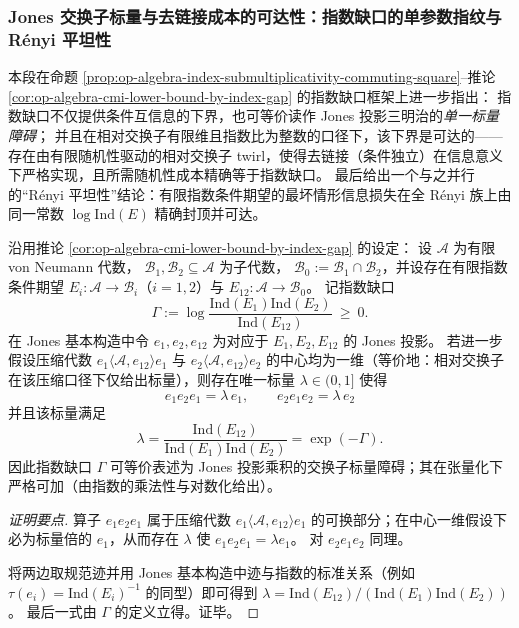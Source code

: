 \subsubsection{Jones 交换子标量与去链接成本的可达性：指数缺口的单参数指纹与 Rényi 平坦性}\label{subsubsec:op-algebra-jones-scalar-twirl-cost-renyi-flatness}
本段在命题 \ref{prop:op-algebra-index-submultiplicativity-commuting-square}--推论 \ref{cor:op-algebra-cmi-lower-bound-by-index-gap} 的指数缺口框架上进一步指出：
指数缺口不仅提供条件互信息的下界，也可等价读作 Jones 投影三明治的\emph{单一标量障碍}；
并且在相对交换子有限维且指数比为整数的口径下，该下界是可达的——存在由有限随机性驱动的相对交换子 twirl，使得去链接（条件独立）在信息意义下严格实现，且所需随机性成本精确等于指数缺口。
最后给出一个与之并行的“Rényi 平坦性”结论：有限指数条件期望的最坏情形信息损失在全 Rényi 族上由同一常数 \(\log\mathrm{Ind}(E)\) 精确封顶并可达。

\begin{proposition}\label{prop:op-algebra-jones-scalar-equals-exp-minus-gap}
沿用推论 \ref{cor:op-algebra-cmi-lower-bound-by-index-gap} 的设定：
设 \(\mathcal{A}\) 为有限 von Neumann 代数，
\(\mathcal{B}_1,\mathcal{B}_2\subseteq\mathcal{A}\) 为子代数，
\(\mathcal{B}_0:=\mathcal{B}_1\cap\mathcal{B}_2\)，并设存在有限指数条件期望
\(
E_i:\mathcal{A}\to\mathcal{B}_i
\)（\(i=1,2\)）与
\(
E_{12}:\mathcal{A}\to\mathcal{B}_0
\)。
记指数缺口
\[
\Gamma:=\log\frac{\mathrm{Ind}(E_1)\mathrm{Ind}(E_2)}{\mathrm{Ind}(E_{12})}\ \ge\ 0.
\]
在 Jones 基本构造中令 \(e_1,e_2,e_{12}\) 为对应于 \(E_1,E_2,E_{12}\) 的 Jones 投影。
若进一步假设压缩代数 \(e_1\langle\mathcal{A},e_{12}\rangle e_1\) 与 \(e_2\langle\mathcal{A},e_{12}\rangle e_2\) 的中心均为一维（等价地：相对交换子在该压缩口径下仅给出标量），则存在唯一标量 \(\lambda\in(0,1]\) 使得
\[
\boxed{\;
e_1e_2e_1=\lambda\,e_1,\qquad e_2e_1e_2=\lambda\,e_2\;}
\]
并且该标量满足
\[
\boxed{\;
\lambda=\frac{\mathrm{Ind}(E_{12})}{\mathrm{Ind}(E_1)\mathrm{Ind}(E_2)}
=\exp(-\Gamma).\;}
\]
因此指数缺口 \(\Gamma\) 可等价表述为 Jones 投影乘积的交换子标量障碍；其在张量化下严格可加（由指数的乘法性与对数化给出）。
\end{proposition}
\begin{proof}[证明要点]
算子 \(e_1e_2e_1\) 属于压缩代数 \(e_1\langle\mathcal{A},e_{12}\rangle e_1\) 的可换部分；在中心一维假设下必为标量倍的 \(e_1\)，从而存在 \(\lambda\) 使 \(e_1e_2e_1=\lambda e_1\)。
对 \(e_2e_1e_2\) 同理。
\par
将两边取规范迹并用 Jones 基本构造中迹与指数的标准关系（例如 \(\tau(e_i)=\mathrm{Ind}(E_i)^{-1}\) 的同型）即可得到
\(
\lambda=\mathrm{Ind}(E_{12})/(\mathrm{Ind}(E_1)\mathrm{Ind}(E_2))
\)。
最后一式由 \(\Gamma\) 的定义立得。证毕。
\end{proof}


